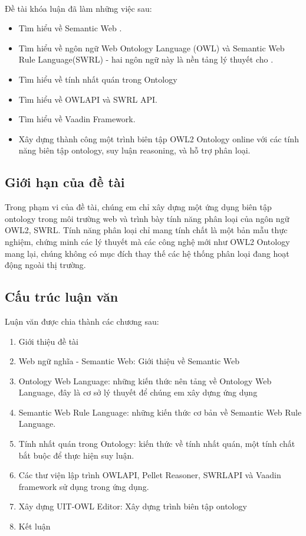 \\
Đề tài khóa luận đã làm những việc sau:
\begin{itemize}
\item Tìm hiểu về Semantic Web .
\item Tìm hiểu về ngôn ngữ Web Ontology Language (OWL) và Semantic Web Rule Language(SWRL) - hai ngôn ngữ này là nền tảng lý thuyết cho .
\item Tìm hiểu về tính nhất quán trong Ontology
\item Tìm hiểu về OWLAPI và SWRL API.
\item Tìm hiểu về Vaadin Framework.
\item Xây dựng thành công một trình biên tập OWL2 Ontology online với các tính năng biên tập ontology, suy luận reasoning, và hỗ trợ phân loại.
\end{itemize}
\subsection{Giới hạn của đề tài}
Trong phạm vi của đề tài, chúng em chỉ xây dựng một ứng dụng biên tập ontology trong môi trường web và trình bày tính năng phân loại của ngôn ngữ OWL2, SWRL. Tính năng phân loại chỉ mang tính chất là một bản mẫu thực nghiệm, chứng minh các lý thuyết mà các công nghệ mới như OWL2 Ontology mang lại, chúng không có mục đích thay thế các hệ thống phân loại đang hoạt động ngoài thị trường.
\subsection{Cấu trúc luận văn}
Luận văn được chia thành các chương sau:
\begin{enumerate}
\item Giới thiệu đề tài
\item Web ngữ nghĩa - Semantic Web: Giới thiệu về Semantic Web
\item Ontology Web Language: những kiến thức nên tảng về Ontology Web Language, đây là cơ sở lý thuyết để chúng em xây dựng ứng dụng
\item Semantic Web Rule Language: những kiến thức cơ bản về Semantic Web Rule Language.
\item Tính nhất quán trong Ontology: kiến thức về tính nhất quán, một tính chất bắt buộc để thực hiện suy luận.
\item Các thư viện lập trình OWLAPI, Pellet Reasoner, SWRLAPI và Vaadin framework sử dụng trong ứng dụng.
\item Xây dựng UIT-OWL Editor: Xây dựng trình biên tập ontology
\item Kết luận 
\end{enumerate}
